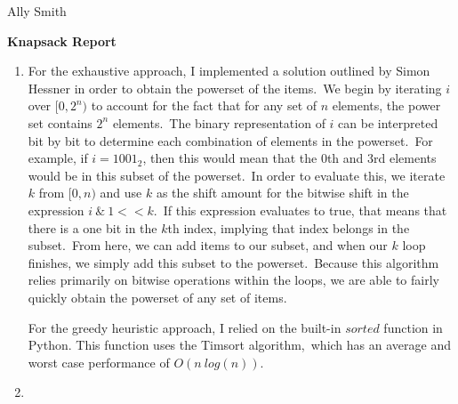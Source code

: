 \documentclass[12pt]{article}
\begin{document}
\newcommand{\I}{\mbox{{\em Int}}}
\newcommand{\lt}{\mbox{{\em left}}}
\newcommand{\rt}{\mbox{{\em right}}}
\newcommand{\ld}{\Delta^l}
\newcommand{\rd}{\Delta^r}
\newcommand{\lsp}[1]{\large\renewcommand{\baselinestretch}{#1}\normalsize}
\newcommand{\hsp}{\hspace{.2in}}

\def\Endwhile{\mbox{\bf endwhile\ }}
\def\Or{\mbox{\bf or\ }}
\def\Do{\mbox{\bf do\ }}
\def\Downto{\mbox{\bf downto\ }}
\def\Int{\mbox{\bf int\ }}
\def\To{\mbox{\bf to\ }}
\def\Repeat{\mbox{\bf repeat\ }}
\def\Until{\mbox{\bf until\ }}
\def\Return{\mbox{\bf return\ }}
\def\Not{\mbox{\bf not\ }}
\def\And{\mbox{\bf and\ }}
\def\For{\mbox{\bf for\ }}
\def\Foreach{\mbox{\bf foreach\ }}
\def\Else{\mbox{\bf else\ }}
\def\Elseif{\mbox{\bf elseif\ }}
\def\End{\mbox{\bf end\ }}
\def\If{\mbox{\bf if\ }}
\def\Mod{\mbox{\bf \ mod\ }}
\def\Then{\mbox{\bf then\ }}
\def\While{\mbox{\bf while\ }}
\def\Output{\mbox{\bf output\ }}


\lsp{1}
\pagestyle{plain}
\hfill Ally Smith
\begin{center}
{\bf
Knapsack Report
}
\end{center}

\begin{enumerate}
\item For the exhaustive approach, I implemented a solution outlined by Simon Hessner in order to obtain the powerset of the items.\
We begin by iterating $i$ over $[0, 2^n)$ to account for the fact that for any set of $n$ elements, the power set contains $2^n$ elements.\
The binary representation of $i$ can be interpreted bit by bit to determine each combination of elements in the powerset.\
For example, if $i = 1001_2$, then this would mean that the 0th and 3rd elements would be in this subset of the powerset.\
In order to evaluate this, we iterate $k$ from $[0, n)$ and use $k$ as the shift amount for the bitwise shift in the expression $i\ \&\ 1<<k$.\
If this expression evaluates to true, that means that there is a one bit in the $k$th index, implying that index belongs in the subset.\
From here, we can add items to our subset, and when our $k$ loop finishes, we simply add this subset to the powerset.\
Because this algorithm relies primarily on bitwise operations within the loops, we are able to fairly quickly obtain the powerset of any set of items.

For the greedy heuristic approach, I relied on the built-in $sorted$ function in Python. This function uses the Timsort algorithm,\
which has an average and worst case performance of $O(n\ log(n))$. 

\item 


\end{enumerate}
\end{document}
